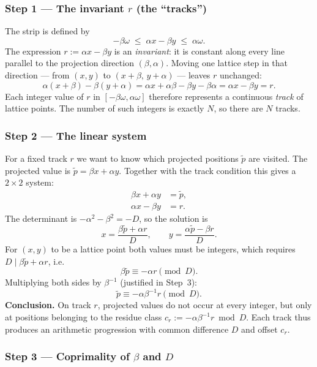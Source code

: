 \documentclass{amsart}
\theoremstyle{definition}
\theoremstyle{plain}
\theoremstyle{remark}
\begin{document}
\subsubsection*{Step 1 --- The invariant \(r\) (the ``tracks'')}

The strip is defined by
\[
  -\beta\omega \;\le\; \alpha x - \beta y \;\le\; \alpha\omega.
\]
The expression \(r := \alpha x - \beta y\) is an \emph{invariant}: it is
constant along every line parallel to the projection direction \((\beta,\alpha)\).
Moving one lattice step in that direction --- from \((x,y)\) to
\((x+\beta,\,y+\alpha)\) --- leaves \(r\) unchanged:
\[
  \alpha(x+\beta)-\beta(y+\alpha)=\alpha x+\alpha\beta-\beta y-\beta\alpha
  =\alpha x-\beta y=r.
\]
Each integer value of \(r\) in \([-\beta\omega,\alpha\omega]\) therefore
represents a continuous \emph{track} of lattice points.  The number of such
integers is exactly \(N\), so there are \(N\) tracks.

\subsubsection*{Step 2 --- The linear system}

For a fixed track \(r\) we want to know which projected positions \(\tilde{p}\)
are visited.  The projected value is \(\tilde{p}=\beta x+\alpha y\).  Together
with the track condition this gives a \(2\times2\) system:
\begin{align*}
  \beta x + \alpha y &= \tilde{p},\\
  \alpha x - \beta y &= r.
\end{align*}
The determinant is \(-\alpha^2-\beta^2=-D\), so the solution is
\[
  x = \frac{\beta\tilde{p}+\alpha r}{D}, \qquad
  y = \frac{\alpha\tilde{p}-\beta r}{D}.
\]
For \((x,y)\) to be a lattice point both values must be integers, which requires
\(D \mid \beta\tilde{p}+\alpha r\), i.e.\
\[
  \beta\tilde{p} \equiv -\alpha r \pmod{D}.
\]
Multiplying both sides by \(\beta^{-1}\) (justified in Step~3):
\[
  \tilde{p} \equiv -\alpha\beta^{-1}r \pmod{D}.
\]
\textbf{Conclusion.}  On track \(r\), projected values do not occur at every
integer, but only at positions belonging to the residue class
\(c_r := -\alpha\beta^{-1}r \bmod D\).  Each track thus produces an arithmetic
progression with common difference \(D\) and offset \(c_r\).

\subsubsection*{Step 3 --- Coprimality of \(\beta\) and \(D\)}
\end{document}
